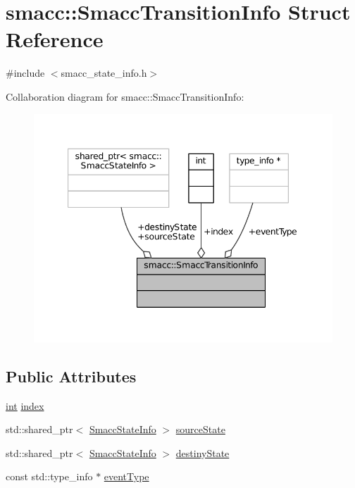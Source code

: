 \hypertarget{structsmacc_1_1SmaccTransitionInfo}{}\section{smacc\+:\+:Smacc\+Transition\+Info Struct Reference}
\label{structsmacc_1_1SmaccTransitionInfo}


{\ttfamily \#include $<$smacc\+\_\+state\+\_\+info.\+h$>$}



Collaboration diagram for smacc\+:\+:Smacc\+Transition\+Info\+:
\nopagebreak
\begin{figure}[H]
\begin{center}
\leavevmode
\includegraphics[width=347pt]{structsmacc_1_1SmaccTransitionInfo__coll__graph}
\end{center}
\end{figure}
\subsection*{Public Attributes}
\begin{DoxyCompactItemize}
\item 
\hyperlink{classint}{int} \hyperlink{structsmacc_1_1SmaccTransitionInfo_a629160558f789d6812c7edd54707e053}{index}
\item 
std\+::shared\+\_\+ptr$<$ \hyperlink{classsmacc_1_1SmaccStateInfo}{Smacc\+State\+Info} $>$ \hyperlink{structsmacc_1_1SmaccTransitionInfo_a959ee5f468cba2f7b19e4d35f94cc564}{source\+State}
\item 
std\+::shared\+\_\+ptr$<$ \hyperlink{classsmacc_1_1SmaccStateInfo}{Smacc\+State\+Info} $>$ \hyperlink{structsmacc_1_1SmaccTransitionInfo_a3deee8ced495b363eeca7f0e53d9a5af}{destiny\+State}
\item 
const std\+::type\+\_\+info $\ast$ \hyperlink{structsmacc_1_1SmaccTransitionInfo_aed5d6efa53816d840b1f7e254ebb6134}{event\+Type}
\end{DoxyCompactItemize}



